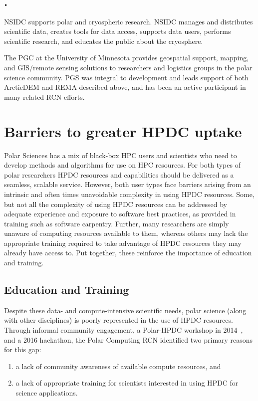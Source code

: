 \texttt{•}\documentclass[10pt,letterpaper,draft]{article}
\begin{document}
\begin{description}[style=unboxed]
	\item[National Snow and Ice Data Center (NSIDC):] NSIDC supports polar and cryospheric research. NSIDC manages and distributes scientific data, creates tools for data access, supports data users, performs scientific research, and educates the public about the cryosphere.
 
	\item[Polar Geospatial Center (PGC):] The PGC at the University of Minnesota provides geospatial support, mapping, and GIS/remote sensing solutions to researchers and logistics groups in the polar science community. PGS was integral to development and leads support of both ArcticDEM and REMA described above, and has been an active participant in many related RCN efforts.

\end{description}

\section{Barriers to greater HPDC uptake}

Polar Sciences has a mix of black-box HPC users and scientists who need to develop methods and algorithms for use on HPC resources. For both types of polar researchers HPDC resources and capabilities should be delivered as a seamless, scalable service. However, both user types face barriers arising from an intrinsic and often times unavoidable complexity in using HPDC resources. Some, but not all the complexity of using HPDC resources can be addressed by adequate experience and exposure to software best practices, as provided in training such as software carpentry. Further, many researchers are simply unaware of computing resources available to them, whereas others may lack the appropriate training required to take advantage of HPDC resources they may already have access to. Put together, these reinforce the importance of education and training.

\subsection*{Education and Training}

Despite these data- and compute-intensive scientific needs, polar science (along with other disciplines) is poorly represented in the use of HPDC resources. Through informal community engagement, a Polar-HPDC workshop in 2014~\cite{hackathon_guide}, and a 2016 hackathon, the Polar Computing RCN identified two primary reasons for this gap:
\begin{enumerate}
\item a lack of community awareness of available compute resources, and
\item a lack of appropriate training for scientists interested in using HPDC for science applications.
\end{enumerate} 
\end{document}
